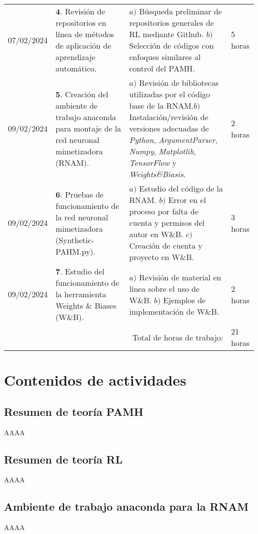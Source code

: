 \documentclass[12pt]{article}
\begin{document}
\begin{minipage}[h]{\textwidth}
	\centering
	\begin{tabularx}{\textwidth}{|p{2cm}|X|X|p{2cm}|} 
		\hline		
		
	 	07/02/2024 & 
	 	$\mathbf{4}.$ Revisión de repositorios en línea de métodos de aplicación de aprendizaje automático. & 
	 	$a)$ Búsqueda preliminar de repositorios generales de RL mediante Github. \newline $b)$ Selección de códigos con enfoques similares al control del PAMH. \newline & 
	 	5 horas \\
	 	09/02/2024 & 
	 	$\mathbf{5}.$ Creación del ambiente de trabajo anaconda para montaje de la red neuronal mimetizadora (RNAM). & 
	 	$a)$ Revisión de bibliotecas utilizadas por el código base de la RNAM.\newline $b)$ Instalación/revisión de versiones adecuadas de \textit{Python}, \textit{ArgumentParser}, \textit{Numpy}, \textit{Matplotlib}, \textit{TensorFlow} y \textit{Weights\&Biasis}.\newline & 
	 	2 horas \\
	 	09/02/2024 & 
	 	$\mathbf{6}.$ Pruebas de funcionamiento de la red neuronal mimetizadora (Synthetic-PAHM.py). & 
	 	$a)$ Estudio del código de la RNAM. \newline $b)$ Error en el proceso por falta de cuenta y permisos del autor en W\&B. \newline $c)$ Creación de cuenta y proyecto en W\&B. \newline & 
	 	3 horas \\
	 	09/02/2024 & 
	 	$\mathbf{7}.$ Estudio del funcionamiento de la herramienta Weights \& Biases (W\&B). & 
	 	$a)$ Revisión de material en línea sobre el uso de W\&B. \newline $b)$ Ejemplos de implementación de W\&B. & 
	 	2 horas \\
	 	\hline
		\multicolumn{3}{|r|}{Total de horas de trabajo:} & 21 horas \\ 
	 	\hline                 
	\end{tabularx}
\end{minipage}

\section*{Contenidos de actividades}

\subsection*{Resumen de teoría PAMH}

AAAA

\subsection*{Resumen de teoría RL}

AAAA

\subsection*{Ambiente de trabajo anaconda para la RNAM}

AAAA
\end{document}
